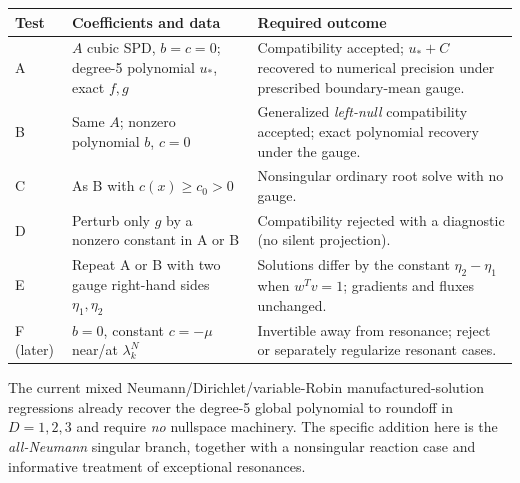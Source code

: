 \documentclass[11pt,letterpaper]{article}
\begin{document}
\begin{center}
\small
\begin{tabularx}{\textwidth}{@{}p{}p{}X@{}}
\toprule
Test & Coefficients and data & Required outcome\\
\midrule
A & $A$ cubic SPD, $b=c=0$; degree-5 polynomial $u_*$, exact $f,g$ & Compatibility accepted; $u_*+C$ recovered to numerical precision under prescribed boundary-mean gauge.\\
B & Same $A$; nonzero polynomial $b$, $c=0$ & Generalized \emph{left-null} compatibility accepted; exact polynomial recovery under the gauge.\\
C & As B with $c(x)\ge c_0>0$ & Nonsingular ordinary root solve with no gauge.\\
D & Perturb only $g$ by a nonzero constant in A or B & Compatibility rejected with a diagnostic (no silent projection).\\
E & Repeat A or B with two gauge right-hand sides $\eta_1,\eta_2$ & Solutions differ by the constant $\eta_2-\eta_1$ when $w^Tv=1$; gradients and fluxes unchanged.\\
F (later) & $b=0$, constant $c=-\mu$ near/at $\lambda_k^N$ & Invertible away from resonance; reject or separately regularize resonant cases.\\
\bottomrule
\end{tabularx}
\end{center}

The current mixed Neumann/Dirichlet/variable-Robin manufactured-solution
regressions already recover the degree-5 global polynomial to roundoff in
$D=1,2,3$ and require \emph{no} nullspace machinery. The specific addition
here is the \emph{all-Neumann} singular branch, together with a nonsingular
reaction case and informative treatment of exceptional resonances.
\end{document}
